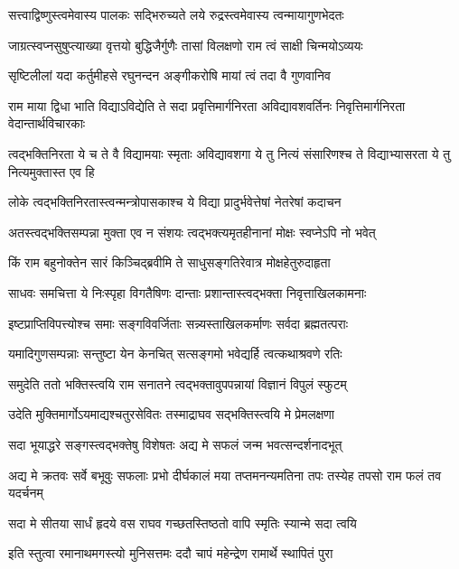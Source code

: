 \twolineshloka
{सत्त्वाद्विष्णुस्त्वमेवास्य पालकः सद्भिरुच्यते}
{लये रुद्रस्त्वमेवास्य त्वन्मायागुणभेदतः} %

\twolineshloka
{जाग्रत्स्वप्नसुषुप्त्याख्या वृत्तयो बुद्धिजैर्गुणैः}
{तासां विलक्षणो राम त्वं साक्षी चिन्मयोऽव्ययः} %

\twolineshloka
{सृष्टिलीलां यदा कर्तुमीहसे रघुनन्दन}
{अङ्गीकरोषि मायां त्वं तदा वै गुणवानिव} %

\threelineshloka
{राम माया द्विधा भाति विद्याऽविद्येति ते सदा}
{प्रवृत्तिमार्गनिरता अविद्यावशवर्तिनः}
{निवृत्तिमार्गनिरता वेदान्तार्थविचारकाः} %

\threelineshloka
{त्वद्भक्तिनिरता ये च ते वै विद्यामयाः स्मृताः}
{अविद्यावशगा ये तु नित्यं संसारिणश्च ते}
{विद्याभ्यासरता ये तु नित्यमुक्तास्त एव हि} %

\twolineshloka
{लोके त्वद्भक्तिनिरतास्त्वन्मन्त्रोपासकाश्च ये}
{विद्या प्रादुर्भवेत्तेषां नेतरेषां कदाचन} %

\twolineshloka
{अतस्त्वद्भक्तिसम्पन्ना मुक्ता एव न संशयः}
{त्वद्भक्त्यमृतहीनानां मोक्षः स्वप्नेऽपि नो भवेत्} %

\twolineshloka
{किं राम बहुनोक्तेन सारं किञ्चिद्ब्रवीमि ते}
{साधुसङ्गतिरेवात्र मोक्षहेतुरुदाहृता} %

\twolineshloka
{साधवः समचित्ता ये निःस्पृहा विगतैषिणः}
{दान्ताः प्रशान्तास्त्वद्भक्ता निवृत्ताखिलकामनाः} %

\twolineshloka
{इष्टप्राप्तिविपत्त्योश्च समाः सङ्गविवर्जिताः}
{सन्न्यस्ताखिलकर्माणः सर्वदा ब्रह्मतत्पराः} %

\twolineshloka
{यमादिगुणसम्पन्नाः सन्तुष्टा येन केनचित्}
{सत्सङ्गमो भवेद्यर्हि त्वत्कथाश्रवणे रतिः} %

\twolineshloka
{समुदेति ततो भक्तिस्त्वयि राम सनातने}
{त्वद्भक्तावुपपन्नायां विज्ञानं विपुलं स्फुटम्} %

\twolineshloka
{उदेति मुक्तिमार्गोऽयमाद्यश्चतुरसेवितः}
{तस्माद्राघव सद्भक्तिस्त्वयि मे प्रेमलक्षणा} %

\twolineshloka
{सदा भूयाद्धरे सङ्गस्त्वद्भक्तेषु विशेषतः}
{अद्य मे सफलं जन्म भवत्सन्दर्शनादभूत्} %

\threelineshloka
{अद्य मे क्रतवः सर्वे बभूवुः सफलाः प्रभो}
{दीर्घकालं मया तप्तमनन्यमतिना तपः}
{तस्येह तपसो राम फलं तव यदर्चनम्} %

\twolineshloka
{सदा मे सीतया सार्धं हृदये वस राघव}
{गच्छतस्तिष्ठतो वापि स्मृतिः स्यान्मे सदा त्वयि} %

\twolineshloka
{इति स्तुत्वा रमानाथमगस्त्यो मुनिसत्तमः}
{ददौ चापं महेन्द्रेण रामार्थे स्थापितं पुरा} %

